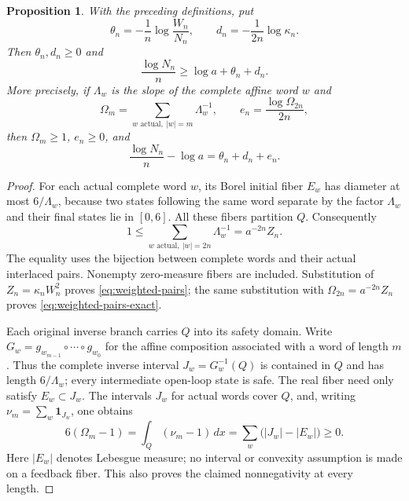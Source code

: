 \documentclass[11pt,reqno]{amsart}
\numberwithin{equation}{section}
\newtheorem{proposition}[theorem]{Proposition}
\theoremstyle{definition}
\theoremstyle{definition}
\newcommand{\one}{\mathbf 1}
\begin{document}
\begin{proposition}\label{prop:weighted-pairs}
With the preceding definitions, put
\[
 \theta_n=-\frac1n\log\frac{W_n}{N_n},\qquad
 d_n=-\frac1{2n}\log\kappa_n.
\]
Then $\theta_n,d_n\ge0$ and
\begin{equation}\label{eq:weighted-pairs}
 \frac{\log N_n}{n}\ge\log a+\theta_n+d_n.
\end{equation}
More precisely, if $\Lambda_w$ is the slope of the complete
affine word $w$ and
\[
 \Omega_m=\sum_{w\text{ actual},\ |w|=m}\Lambda_w^{-1},
 \qquad e_n=\frac{\log\Omega_{2n}}{2n},
\]
then $\Omega_m\ge1$, $e_n\ge0$, and
\begin{equation}\label{eq:weighted-pairs-exact}
 \frac{\log N_n}{n}-\log a=\theta_n+d_n+e_n.
\end{equation}
\end{proposition}
\begin{proof}
For each actual complete word $w$, its Borel initial fiber
$E_w$ has diameter at most $6/\Lambda_w$, because two states
following the same word separate by the factor $\Lambda_w$
and their final states lie in $[0,6]$. All these fibers partition
$Q$. Consequently
\[
 1\le\sum_{w\text{ actual},\ |w|=2n}\Lambda_w^{-1}
       =a^{-2n}Z_n.
\]
The equality uses the bijection between complete words and their
actual interlaced pairs. Nonempty zero-measure fibers are included.
Substitution of $Z_n=\kappa_nW_n^2$ proves
\eqref{eq:weighted-pairs}; the same substitution with
$\Omega_{2n}=a^{-2n}Z_n$ proves
\eqref{eq:weighted-pairs-exact}.

Each original inverse branch carries $Q$ into its safety domain.
Write $G_w=g_{w_{m-1}}\circ\cdots\circ g_{w_0}$ for the affine
composition associated with a word of length $m$.
Thus the complete inverse interval $J_w=G_w^{-1}(Q)$ is contained
in $Q$ and has length $6/\Lambda_w$; every intermediate open-loop
state is safe. The real fiber need only satisfy $E_w\subset J_w$.
The intervals $J_w$ for actual words cover $Q$, and, writing
$\nu_m=\sum_w\one_{J_w}$, one obtains
\[
 6(\Omega_m-1)=\int_Q(\nu_m-1)\,dx
              =\sum_w\bigl(|J_w|-|E_w|\bigr)\ge0.
\]
Here $|E_w|$ denotes Lebesgue measure; no interval or convexity
assumption is made on a feedback fiber. This also proves the
claimed nonnegativity at every length.
\end{proof}
\end{document}
